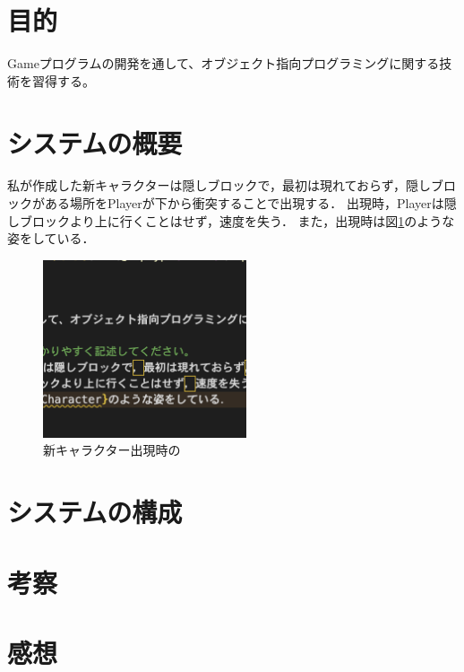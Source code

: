 \documentclass[titlepage]{jarticle}
\begin{document}
\section{目的}
Gameプログラムの開発を通して、オブジェクト指向プログラミングに関する技術を習得する。
\section{システムの概要}
私が作成した新キャラクターは隠しブロックで，最初は現れておらず，隠しブロックがある場所をPlayerが下から衝突することで出現する．
出現時，Playerは隠しブロックより上に行くことはせず，速度を失う．
また，出現時は図\ref{newCharacter}のような姿をしている．
\begin{figure}[H]
  \centering
  \includegraphics[width=6cm]{img/newCharacter.png}
  \caption{新キャラクター出現時の}
  \label{newCharacter}
\end{figure}
\section{システムの構成}
\section{考察}
\section{感想}
\end{document}
